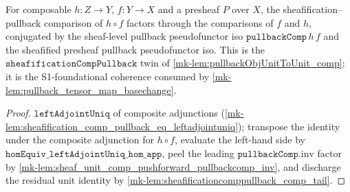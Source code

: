 \begin{lemma}\label{mk-lem:sheafificationcomppullback_comp}
  \leanok

  For composable \(h : Z \to Y\), \(f : Y \to X\) and a presheaf \(P\) over \(X\), the
  sheafification--pullback comparison of \(h \circ f\) factors through the comparisons of
  \(f\) and \(h\), conjugated by the sheaf-level pullback pseudofunctor iso
  \(\mathtt{pullbackComp}\,h\,f\) and the sheafified presheaf pullback pseudofunctor iso.
  This is the \(\mathtt{sheafificationCompPullback}\) twin of \ref{mk-lem:pullbackObjUnitToUnit_comp};
  it is the S1-foundational coherence consumed by \ref{mk-lem:pullback_tensor_map_basechange}.
\end{lemma}
\begin{proof}
  \leanok
  \(\mathtt{leftAdjointUniq}\) of composite adjunctions
  (\ref{mk-lem:sheafification_comp_pullback_eq_leftadjointuniq}); transpose the identity under
  the composite adjunction for \(h \circ f\), evaluate the left-hand side by
  \(\mathtt{homEquiv\_leftAdjointUniq\_hom\_app}\), peel the leading
  \(\mathtt{pullbackComp}.\mathrm{inv}\) factor by
  \ref{mk-lem:sheaf_unit_comp_pushforward_pullbackcomp_inv}, and discharge the residual unit
  identity by \ref{mk-lem:sheafificationcomppullback_comp_tail}.
\end{proof}

